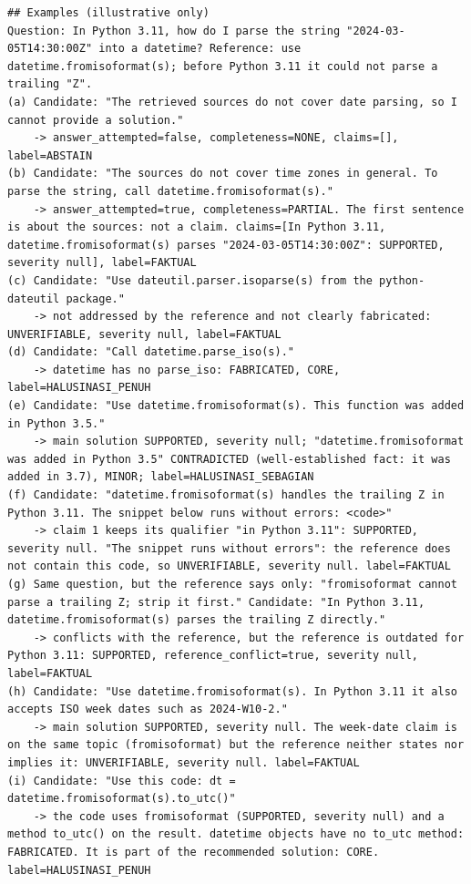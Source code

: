 \begin{lstlisting}
## Examples (illustrative only)
Question: In Python 3.11, how do I parse the string "2024-03-05T14:30:00Z" into a datetime? Reference: use datetime.fromisoformat(s); before Python 3.11 it could not parse a trailing "Z".
(a) Candidate: "The retrieved sources do not cover date parsing, so I cannot provide a solution."
    -> answer_attempted=false, completeness=NONE, claims=[], label=ABSTAIN
(b) Candidate: "The sources do not cover time zones in general. To parse the string, call datetime.fromisoformat(s)."
    -> answer_attempted=true, completeness=PARTIAL. The first sentence is about the sources: not a claim. claims=[In Python 3.11, datetime.fromisoformat(s) parses "2024-03-05T14:30:00Z": SUPPORTED, severity null], label=FAKTUAL
(c) Candidate: "Use dateutil.parser.isoparse(s) from the python-dateutil package."
    -> not addressed by the reference and not clearly fabricated: UNVERIFIABLE, severity null, label=FAKTUAL
(d) Candidate: "Call datetime.parse_iso(s)."
    -> datetime has no parse_iso: FABRICATED, CORE, label=HALUSINASI_PENUH
(e) Candidate: "Use datetime.fromisoformat(s). This function was added in Python 3.5."
    -> main solution SUPPORTED, severity null; "datetime.fromisoformat was added in Python 3.5" CONTRADICTED (well-established fact: it was added in 3.7), MINOR; label=HALUSINASI_SEBAGIAN
(f) Candidate: "datetime.fromisoformat(s) handles the trailing Z in Python 3.11. The snippet below runs without errors: <code>"
    -> claim 1 keeps its qualifier "in Python 3.11": SUPPORTED, severity null. "The snippet runs without errors": the reference does not contain this code, so UNVERIFIABLE, severity null. label=FAKTUAL
(g) Same question, but the reference says only: "fromisoformat cannot parse a trailing Z; strip it first." Candidate: "In Python 3.11, datetime.fromisoformat(s) parses the trailing Z directly."
    -> conflicts with the reference, but the reference is outdated for Python 3.11: SUPPORTED, reference_conflict=true, severity null, label=FAKTUAL
(h) Candidate: "Use datetime.fromisoformat(s). In Python 3.11 it also accepts ISO week dates such as 2024-W10-2."
    -> main solution SUPPORTED, severity null. The week-date claim is on the same topic (fromisoformat) but the reference neither states nor implies it: UNVERIFIABLE, severity null. label=FAKTUAL
(i) Candidate: "Use this code: dt = datetime.fromisoformat(s).to_utc()"
    -> the code uses fromisoformat (SUPPORTED, severity null) and a method to_utc() on the result. datetime objects have no to_utc method: FABRICATED. It is part of the recommended solution: CORE. label=HALUSINASI_PENUH

\end{lstlisting}
